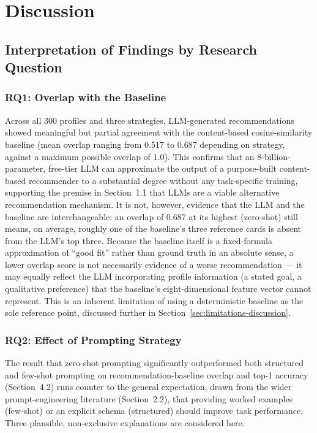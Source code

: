 \chapter{Discussion}
\label{ch:discussion}

\section{Interpretation of Findings by Research Question}
\label{sec:discussion-rq}

\subsection{RQ1: Overlap with the Baseline}

Across all 300 profiles and three strategies, LLM-generated recommendations showed meaningful but partial agreement with the content-based cosine-similarity baseline (mean overlap ranging from 0.517 to 0.687 depending on strategy, against a maximum possible overlap of 1.0). This confirms that an 8-billion-parameter, free-tier LLM can approximate the output of a purpose-built content-based recommender to a substantial degree without any task-specific training, supporting the premise in Section~1.1 that LLMs are a viable alternative recommendation mechanism. It is not, however, evidence that the LLM and the baseline are interchangeable: an overlap of 0.687 at its highest (zero-shot) still means, on average, roughly one of the baseline's three reference cards is absent from the LLM's top three. Because the baseline itself is a fixed-formula approximation of ``good fit'' rather than ground truth in an absolute sense, a lower overlap score is not necessarily evidence of a worse recommendation --- it may equally reflect the LLM incorporating profile information (a stated goal, a qualitative preference) that the baseline's eight-dimensional feature vector cannot represent. This is an inherent limitation of using a deterministic baseline as the sole reference point, discussed further in Section~\ref{sec:limitations-discussion}.

\subsection{RQ2: Effect of Prompting Strategy}
\label{sec:rq2-discussion}

The result that zero-shot prompting significantly outperformed both structured and few-shot prompting on recommendation-baseline overlap and top-1 accuracy (Section~4.2) runs counter to the general expectation, drawn from the wider prompt-engineering literature (Section~2.2), that providing worked examples (few-shot) or an explicit schema (structured) should improve task performance. Three plausible, non-exclusive explanations are considered here.

